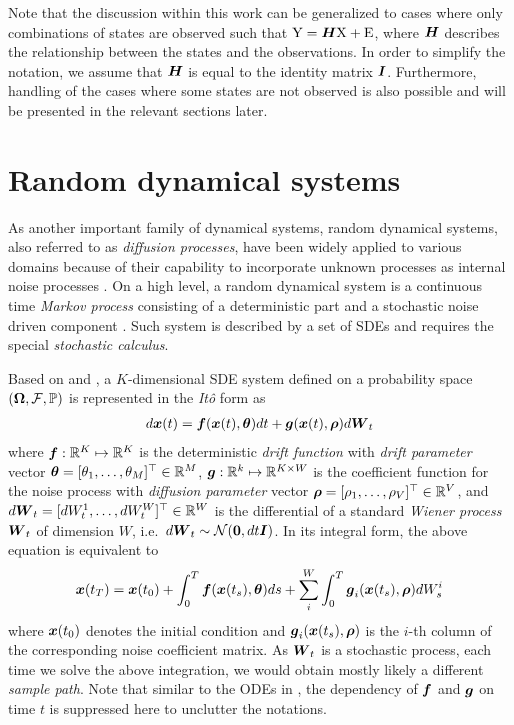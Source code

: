 Note that the discussion within this work can be generalized to cases where only combinations of states are observed such that $\mathrm{Y} = \boldsymbol{H}\mathrm{X} + \mathrm{E}$, where $\boldsymbol{H}$ describes the relationship between the states and the observations.
In order to simplify the notation, we assume that $\boldsymbol{H}$ is equal to the identity matrix $\boldsymbol{I}$.
Furthermore, handling of the cases where some states are not observed is also possible and will be presented in the relevant sections later.

\section{Random dynamical systems}
\label{sec-sdes}
As another important family of dynamical systems, random dynamical systems, also referred to as \emph{diffusion processes}, have been widely applied to various domains because of their capability to incorporate unknown processes as internal noise processes \citep{vrettas2011estimating}.
On a high level, a random dynamical system is a continuous time \emph{Markov process} consisting of a deterministic part and a stochastic noise driven component \citep{riesinger2016solving}.
Such system is described by a set of SDEs and requires the special \emph{stochastic calculus}.

Based on \cite{oksendal2013stochastic} and \cite{vrettas2015variational}, a $K$-dimensional SDE system defined on a probability space $(\boldsymbol{\Omega}, \mathcal{F}, \mathbb{P})$ is represented in the \emph{It\^{o}} form as
\begin{align}
    d\boldsymbol{x}(t) = \boldsymbol{f}(\boldsymbol{x}(t), \boldsymbol{\theta}) dt + \boldsymbol{g}(\boldsymbol{x}(t), \boldsymbol{\rho}) d\boldsymbol{W}_t
\end{align}
where $\boldsymbol{f}: \mathbb{R}^K \mapsto \mathbb{R}^K$ is the deterministic \emph{drift function} with \emph{drift parameter} vector $\boldsymbol{\theta} = [\theta_{1},\dots,\theta_{M}]^\top \in \mathbb{R}^M$, $\boldsymbol{g}: \mathbb{R}^k \mapsto \mathbb{R}^{K \times W}$ is the coefficient function for the noise process with \emph{diffusion parameter} vector $\boldsymbol{\rho} = [\rho_{1},\dots,\rho_{V}]^\top \in \mathbb{R}^V$, and $d\boldsymbol{W}_t = [dW^{1}_{t},\dots,dW^{W}_{t}]^\top \in \mathbb{R}^W$ is the differential of a standard \emph{Wiener process} $\boldsymbol{W}_t$ of dimension $W$, i.e.\ $d\boldsymbol{W}_t \sim \mathcal{N}(\boldsymbol{0}, dt\boldsymbol{I})$.
In its integral form, the above equation is equivalent to
\begin{align}
    \boldsymbol{x}(t_{T}) = \boldsymbol{x}(t_{0}) 
    + \int_0^T{\boldsymbol{f}(\boldsymbol{x}(t_{s}), \boldsymbol{\theta}) ds}
    + \sum_i^W{\int_0^T{\boldsymbol{g}_{i}(\boldsymbol{x}(t_{s}), \boldsymbol{\rho}) dW^{i}_{s}}}
\end{align}
where $\boldsymbol{x}(t_{0})$ denotes the initial condition and $\boldsymbol{g}_{i}(\boldsymbol{x}(t_{s}), \boldsymbol{\rho})$ is the $i$-th column of the corresponding noise coefficient matrix.
As $\boldsymbol{W}_t$ is a stochastic process, each time we solve the above integration, we would obtain mostly likely a different \emph{sample path}.
Note that similar to the ODEs in , the dependency of $\boldsymbol{f}$ and $\boldsymbol{g}$ on time $t$ is suppressed here to unclutter the notations.

